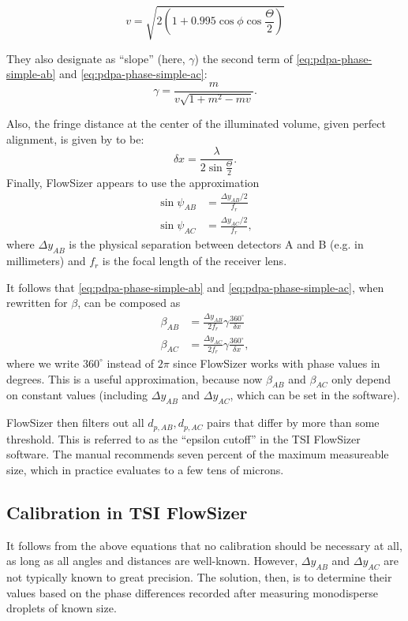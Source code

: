 \documentclass[11.5pt,oneside]{book}
\begin{document}
\begin{equation}
    v = \sqrt{2(1 + 0.995 \cos \phi \cos \frac{\Theta}{2})}
\end{equation}

They also designate as ``slope'' (here, $\gamma$) the second term of
\eqref{eq:pdpa-phase-simple-ab} and \eqref{eq:pdpa-phase-simple-ac}:
\begin{equation}
    \gamma = \frac{m}{v \sqrt{1 + m^2 - mv}}.
\end{equation}

Also, the fringe distance at the center of the illuminated volume, given
perfect alignment, is given by \citet{Albrecht03} to be:
\begin{equation}
    \delta x = \frac{\lambda}{2 \sin \frac{\Theta}{2}}.
\end{equation}
Finally, FlowSizer appears to use the approximation 
\begin{align}
    \sin \psi_{AB} &= \frac{\Delta y_{AB}/2}{f_r} \\
    \sin \psi_{AC} &= \frac{\Delta y_{AC}/2}{f_r},
\end{align}
where $\Delta y_{AB}$ is the physical separation between detectors A and B (e.g. in
millimeters) and $f_r$ is the focal length of the receiver lens.

It follows that \eqref{eq:pdpa-phase-simple-ab} and \eqref{eq:pdpa-phase-simple-ac}, when
rewritten for $\beta$, can be composed as
\begin{align}
    \beta_{AB} &= \frac{\Delta y_{AB}}{2f_r} \gamma \frac{360^\circ}{\delta x} \\
    \beta_{AC} &= \frac{\Delta y_{AC}}{2f_r} \gamma \frac{360^\circ}{\delta x},
\end{align}
where we write $360^\circ$ instead of $2\pi$ since FlowSizer works with phase
values in degrees. This is a useful approximation, because now $\beta_{AB}$ and
$\beta_{AC}$ only depend on constant values (including $\Delta y_{AB}$ and
$\Delta y_{AC}$, which can be set in the software).

FlowSizer then filters out all $d_{p,AB}, d_{p,AC}$ pairs that differ by more than some
threshold. This is referred to as the ``epsilon cutoff'' in the TSI FlowSizer
software. The manual recommends seven percent of the maximum measureable size,
which in practice evaluates to a few tens of microns.

\subsection{Calibration in TSI FlowSizer}
It follows from the above equations that no calibration should be necessary at
all, as long as all angles and distances are well-known. However, $\Delta
y_{AB}$ and $\Delta y_{AC}$ are not typically known to great precision. The
solution, then, is to determine their values based on the phase differences
recorded after measuring monodisperse droplets of known size.
\end{document}
